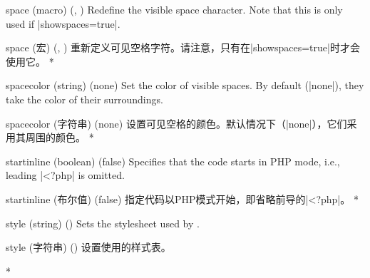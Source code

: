 \begin{optionlist}
\begin{paracol}{2}
\item[space (macro) (\string\textvisiblespace, \textvisiblespace)]
Redefine the visible space character.  Note that this is only used if |showspaces=true|.
\switchcolumn
\item[space (宏) (\string\textvisiblespace, \textvisiblespace)]
重新定义可见空格字符。请注意，只有在|showspaces=true|时才会使用它。
\switchcolumn[0]*%

\item[spacecolor (string) (none)]
Set the color of visible spaces.  By default (|none|), they take the color of their surroundings.
\switchcolumn
\item[spacecolor (字符串) (none)]
设置可见空格的颜色。默认情况下（|none|），它们采用其周围的颜色。
\switchcolumn[0]*%

  \item[startinline (boolean) (false)] 
    Specifies that the code starts in PHP mode, i.e., leading |<?php| is omitted.
    \switchcolumn
    \item[startinline (布尔值) (false)] 
    指定代码以PHP模式开始，即省略前导的|<?php|。
\switchcolumn[0]*%
  \item[style] (string) ()
    Sets the stylesheet used by .
    \switchcolumn
    \item[style] (字符串) ()
    设置使用的样式表。


\switchcolumn[0]*%


\end{paracol}
\end{optionlist}

